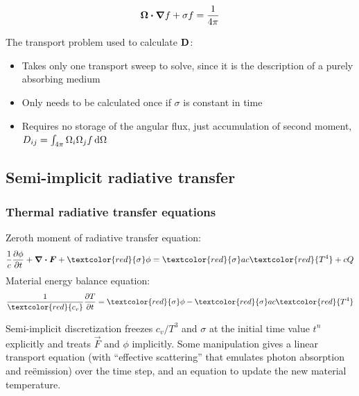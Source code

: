 \documentclass{beamer}
\newcommand{\Dtens}{\mat{D}}
\newcommand{\notebox}[1]{\hspace{.1\columnwidth}\colorbox{lightgray}{\parbox{0.8\columnwidth}{\small
#1}}}
\begin{document}
\begin{frame}
  \begin{equation*}
    \bm{\Omega}\bm{\cdot} \bm{\nabla} f + \sigma f = \frac{1}{4\pi}
  \end{equation*}

  The transport problem used to calculate $\Dtens$:
  \begin{itemize}
    \item Takes only one transport sweep to solve, since it is the description
      of a purely absorbing medium
    \item Only needs to be calculated once if $\sigma$ is constant in time
    \item Requires no storage of the angular flux, just accumulation of second
      moment, $D_{ij} = \int_{4\pi} \Omega_i \Omega_j f \mathop{}\!\mathrm{d} \Omega$
  \end{itemize}
\end{frame}

\subsection{Semi-implicit radiative transfer}
\begin{frame}
  \frametitle{Thermal radiative transfer equations}
Zeroth moment of radiative transfer equation:
\begin{equation*}
  \frac{1}{c} \pder{\phi}{t}
  + \del \vd \vec{F} + \textcolor{red}{\sigma} \phi
  = \textcolor{red}{\sigma} ac\textcolor{red}{T^4}
  + c Q
\end{equation*}
Material energy balance equation:
\begin{equation*}
  \frac{1}{\textcolor{red}{c_v}}\pder{T}{t} = \textcolor{red}{\sigma} \phi -
  \textcolor{red}{\sigma} ac\textcolor{red}{T^4}
\end{equation*}

Semi-implicit discretization freezes $c_v/T^3$ and $\sigma$ at the initial time
value $t^n$ explicitly and treats $\vec{F}$ and $\phi$ implicitly. Some
manipulation gives a linear transport equation (with ``effective scattering''
that emulates photon absorption and re\"emission) over the time step, and an
equation to update the new material temperature.
%
\end{frame}
\end{document}

